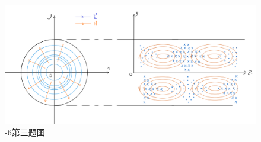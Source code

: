     \begin{figure}[htp]
        \centering
        \includegraphics[width=15cm]{figure/appendix/2-6(3).jpg}
        \caption{-6第三题图}\label{Fig: 2-6(3)}
    \end{figure}
    \\[15pt]
